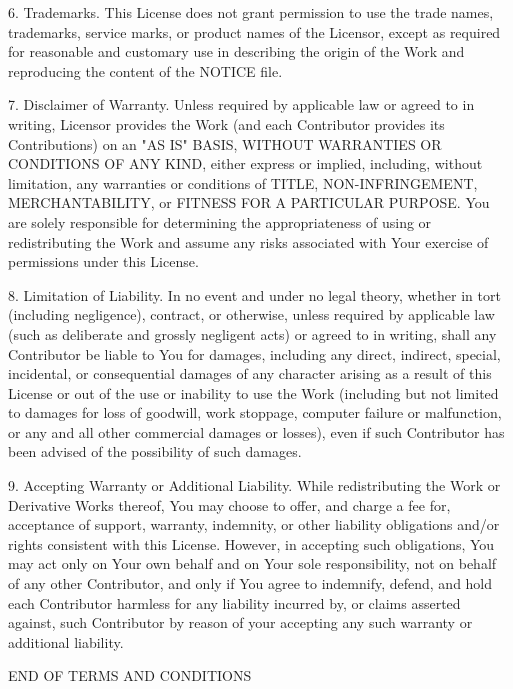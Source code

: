 \documentclass[twoside]{tceusermanual}
\begin{document}
   6. Trademarks. This License does not grant permission to use the trade
      names, trademarks, service marks, or product names of the Licensor,
      except as required for reasonable and customary use in describing the
      origin of the Work and reproducing the content of the NOTICE file.

   7. Disclaimer of Warranty. Unless required by applicable law or
      agreed to in writing, Licensor provides the Work (and each
      Contributor provides its Contributions) on an "AS IS" BASIS,
      WITHOUT WARRANTIES OR CONDITIONS OF ANY KIND, either express or
      implied, including, without limitation, any warranties or conditions
      of TITLE, NON-INFRINGEMENT, MERCHANTABILITY, or FITNESS FOR A
      PARTICULAR PURPOSE. You are solely responsible for determining the
      appropriateness of using or redistributing the Work and assume any
      risks associated with Your exercise of permissions under this License.

   8. Limitation of Liability. In no event and under no legal theory,
      whether in tort (including negligence), contract, or otherwise,
      unless required by applicable law (such as deliberate and grossly
      negligent acts) or agreed to in writing, shall any Contributor be
      liable to You for damages, including any direct, indirect, special,
      incidental, or consequential damages of any character arising as a
      result of this License or out of the use or inability to use the
      Work (including but not limited to damages for loss of goodwill,
      work stoppage, computer failure or malfunction, or any and all
      other commercial damages or losses), even if such Contributor
      has been advised of the possibility of such damages.

   9. Accepting Warranty or Additional Liability. While redistributing
      the Work or Derivative Works thereof, You may choose to offer,
      and charge a fee for, acceptance of support, warranty, indemnity,
      or other liability obligations and/or rights consistent with this
      License. However, in accepting such obligations, You may act only
      on Your own behalf and on Your sole responsibility, not on behalf
      of any other Contributor, and only if You agree to indemnify,
      defend, and hold each Contributor harmless for any liability
      incurred by, or claims asserted against, such Contributor by reason
      of your accepting any such warranty or additional liability.

   END OF TERMS AND CONDITIONS
\end{document}
